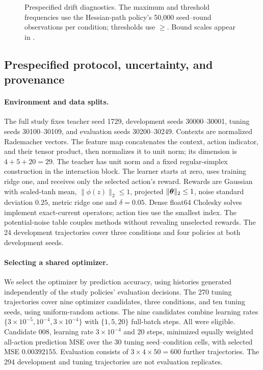 \begin{figure}[p]
  \centering
  
 \caption{Prespecified drift diagnostics. The maximum and threshold frequencies use the Hessian-path policy's 50,000 seed--round observations per condition; thresholds use $\ge$. Bound scales appear in .}
 \label{fig:transport-followup-drift-bounds}
\end{figure}
\FloatBarrier

\subsection{Prespecified protocol, uncertainty, and provenance}

\paragraph{Environment and data splits.}
The full study fixes teacher seed 1729, development seeds 30000--30001,
tuning seeds 30100--30109, and evaluation seeds 30200--30249.
Contexts are normalized Rademacher vectors.  The feature map concatenates the
context, action indicator, and their tensor product, then normalizes it to
unit norm; its dimension is $4+5+20=29$.  The teacher has unit norm and a fixed
regular-simplex construction in the interaction block.  The learner starts at
zero, uses training ridge one, and receives only the selected action's reward.
Rewards are Gaussian with scaled-tanh mean, $\|\phi(z)\|_2\le1$, projected
$\|\boldsymbol{\theta}\|_2\le1$, noise standard deviation $0.25$, metric ridge one and
$\delta=0.05$. Dense float64 Cholesky solves implement exact-current operators;
action ties use the smallest index.
The potential-noise table couples methods without revealing unselected rewards.
The 24 development trajectories cover three conditions and four policies at
both development seeds.

\paragraph{Selecting a shared optimizer.}
We select the optimizer by prediction accuracy, using histories generated
independently of the study policies' evaluation decisions.  The 270 tuning
trajectories cover nine optimizer
candidates, three conditions, and ten tuning seeds, using uniform-random
actions.  The nine candidates combine learning rates
$\{3\times10^{-5},10^{-4},3\times10^{-4}\}$ with $\{1,5,20\}$ full-batch steps.
All were eligible.  Candidate 008, learning rate $3\times10^{-4}$ and 20 steps,
minimized equally weighted all-action prediction MSE over the 30 tuning
seed--condition cells, with selected MSE $0.00392155$.
Evaluation consists of $3\times4\times50=600$ further trajectories.  The 294
development and tuning trajectories are not evaluation replicates.

